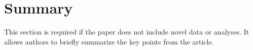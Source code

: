 \section*{Summary} %
This section is required if the paper does not include novel data or analyses.  It allows authors to briefly summarize the key points from the article.
